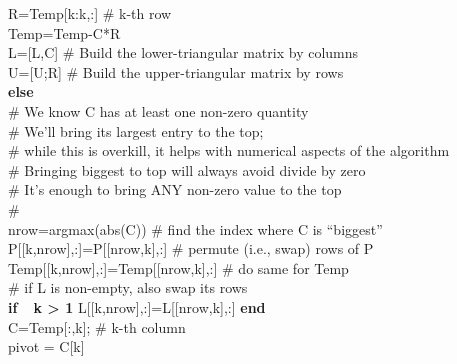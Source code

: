 \begin{tcolorbox}[sharp corners, colback=green!30, colframe=green!80!blue, title=\textbf{\Large LU Factorization of Square Matrices}]
\hspace*{.6cm}   R={\rm Temp}[k:k,:] \# k-th row\\
\hspace*{.6cm}     {\rm Temp}={\rm Temp}-C*R \\
\hspace*{.6cm}      L=[L,C]  \# Build the lower-triangular matrix by columns\\
\hspace*{.6cm}     U=[U;R] \# Build the upper-triangular matrix by rows\\
\hspace*{.3cm} \textbf{else} \\
\hspace*{.6cm}    \# We know C has at least one non-zero quantity \\ 
\hspace*{.6cm}     \# We'll bring its largest entry to the top; \\
\hspace*{.6cm}     \# while this is overkill, it helps with numerical aspects of the algorithm \\
\hspace*{.6cm}     \# Bringing biggest to top will always avoid divide by zero \\
 \hspace*{.6cm}    \# It's enough to bring ANY non-zero value to the top \\
 \hspace*{.6cm}    \# \\
 \hspace*{.6cm}   nrow=argmax(abs(C)) \# find the index where C is ``biggest'' \\
\hspace*{.6cm}    P[[k,nrow],:]=P[[nrow,k],:] \# permute (i.e., swap) rows of P  \\
\hspace*{.6cm}   {\rm Temp}[[k,nrow],:]={\rm Temp}[[nrow,k],:] \# do same for {\rm Temp}\\
\hspace*{.6cm}    \# if L is non-empty, also swap its rows \\
\hspace*{.6cm}    \textbf{if~~{k > 1}} { L[[k,nrow],:]=L[[nrow,k],:] } \textbf{end} \\
\hspace*{.6cm}     C=Temp[:,k]; \# k-th column\\
\hspace*{.6cm}     pivot = C[k]\\

\end{tcolorbox}
